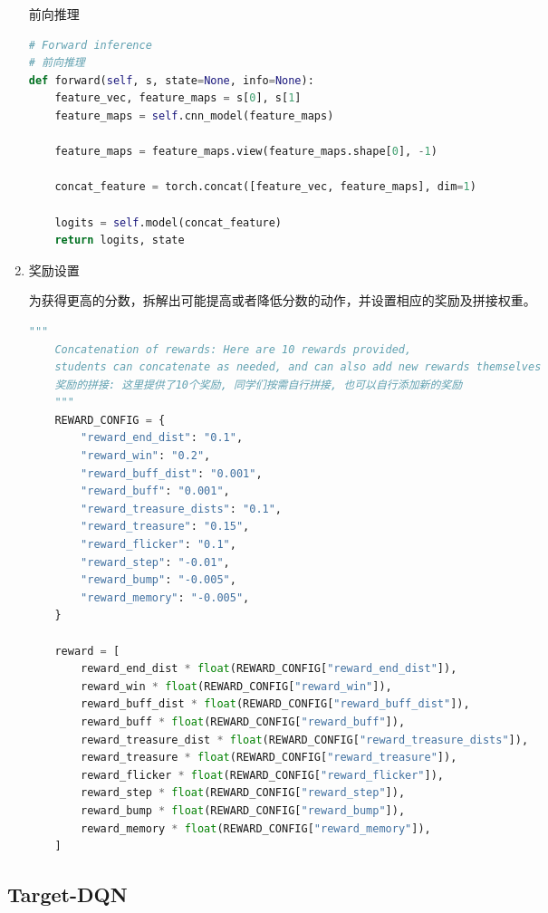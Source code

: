\begin{enumerate}
前向推理

\begin{lstlisting}[language=Python]
# Forward inference
# 前向推理
def forward(self, s, state=None, info=None):
    feature_vec, feature_maps = s[0], s[1]
    feature_maps = self.cnn_model(feature_maps)

    feature_maps = feature_maps.view(feature_maps.shape[0], -1)

    concat_feature = torch.concat([feature_vec, feature_maps], dim=1)

    logits = self.model(concat_feature)
    return logits, state
\end{lstlisting}

 \item 奖励设置

为获得更高的分数，拆解出可能提高或者降低分数的动作，并设置相应的奖励及拼接权重。

\begin{lstlisting}[language=Python]
    """
    Concatenation of rewards: Here are 10 rewards provided,
    students can concatenate as needed, and can also add new rewards themselves
    奖励的拼接: 这里提供了10个奖励, 同学们按需自行拼接, 也可以自行添加新的奖励
    """
    REWARD_CONFIG = {
        "reward_end_dist": "0.1",
        "reward_win": "0.2",
        "reward_buff_dist": "0.001",
        "reward_buff": "0.001",
        "reward_treasure_dists": "0.1",
        "reward_treasure": "0.15",
        "reward_flicker": "0.1",
        "reward_step": "-0.01",
        "reward_bump": "-0.005",
        "reward_memory": "-0.005",
    }

    reward = [
        reward_end_dist * float(REWARD_CONFIG["reward_end_dist"]),
        reward_win * float(REWARD_CONFIG["reward_win"]),
        reward_buff_dist * float(REWARD_CONFIG["reward_buff_dist"]),
        reward_buff * float(REWARD_CONFIG["reward_buff"]),
        reward_treasure_dist * float(REWARD_CONFIG["reward_treasure_dists"]),
        reward_treasure * float(REWARD_CONFIG["reward_treasure"]),
        reward_flicker * float(REWARD_CONFIG["reward_flicker"]),
        reward_step * float(REWARD_CONFIG["reward_step"]),
        reward_bump * float(REWARD_CONFIG["reward_bump"]),
        reward_memory * float(REWARD_CONFIG["reward_memory"]),
    ]
\end{lstlisting}

\end{enumerate}


\subsection{Target-DQN}

